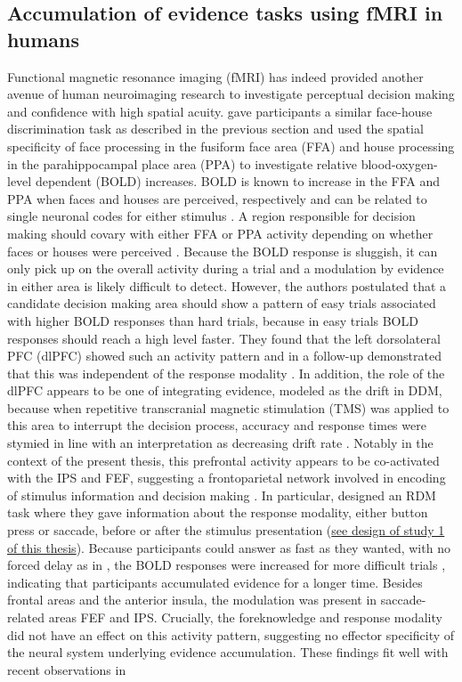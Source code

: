 \subsection{Accumulation of evidence tasks using fMRI in humans}
Functional magnetic resonance imaging (fMRI) has indeed provided another avenue of human neuroimaging research to investigate perceptual decision making and confidence with high spatial acuity. \textcite{Heekeren2004} gave participants a similar face-house discrimination task as described in the previous section \parencite{Philiastides2014} and used the spatial specificity of face processing in the fusiform face area (FFA) and house processing in the parahippocampal place area (PPA) to investigate relative blood-oxygen-level dependent (BOLD) increases. BOLD is known to increase in the FFA and PPA when faces and houses are perceived, respectively and can be related to single neuronal codes for either stimulus \parencite{Epstein1998,Haxby2000,Ishai1999,Kanwisher1997,Logothetis2001,Logothetis2004,McCarthy1997}. A region responsible for decision making should covary with either FFA or PPA activity depending on whether faces or houses were perceived \parencite{Heekeren2004}. Because the BOLD response is sluggish, it can only pick up on the overall activity during a trial and a modulation by evidence in either area is likely difficult to detect. However, the authors postulated that a candidate decision making area should show a pattern of easy trials associated with higher BOLD responses than hard trials, because in easy trials BOLD responses should reach a high level faster. They found that the left dorsolateral PFC (dlPFC) showed such an activity pattern and in a follow-up demonstrated that this was independent of the response modality \parencite{Heekeren2006}. In addition, the role of the dlPFC appears to be one of integrating evidence, modeled as the drift in DDM, because when repetitive transcranial magnetic stimulation (TMS) was applied to this area to interrupt the decision process, accuracy and response times were stymied in line with an interpretation as decreasing drift rate \parencite{Philiastides2011}. Notably in the context of the present thesis, this prefrontal activity appears to be co-activated with the IPS and FEF, suggesting a frontoparietal network involved in encoding of stimulus information and decision making \parencite{Heekeren2006,Ho2009,Kayser2010,Liu2011}. In particular, \textcite{Liu2011} designed an RDM task where they gave information about the response modality, either button press or saccade, before or after the stimulus presentation (\href{https://doi.org/10.3389/fnhum.2017.00576}{see design of study 1 of this thesis}). Because participants could answer as fast as they wanted, with no forced delay as in \textcite{Heekeren2004}, the BOLD responses were increased for more difficult trials \parencite{Hanks2017}, indicating that participants accumulated evidence for a longer time. Besides frontal areas and the anterior insula, the modulation was present in saccade-related areas FEF and IPS. Crucially, the foreknowledge and response modality did not have an effect on this activity pattern, suggesting no effector specificity of the neural system underlying evidence accumulation. These findings fit well with recent observations in 